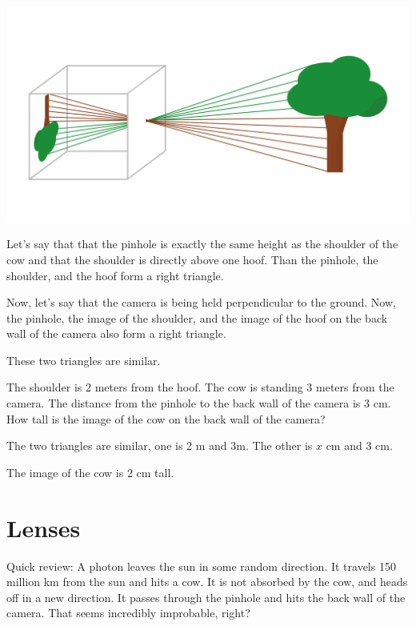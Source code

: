 \includegraphics[width=1\textwidth]{pinhole.png}

\begin{Exercise}[title={Height of the image}, label=image_height]

Let's say that that the pinhole is exactly the same height as the
shoulder of the cow and that the shoulder is directly above one hoof.
Than the pinhole, the shoulder, and the hoof form a right triangle.

Now, let's say that the camera is being held perpendicular to the
ground.  Now, the pinhole, the image of the shoulder, and the image of
the hoof on the back wall of the camera also form a right triangle.

These two triangles are similar.

The shoulder is 2 meters from the hoof.  The cow is standing 3 meters
from the camera.  The distance from the pinhole to the back wall of
the camera is 3 cm.  How tall is the image of the cow on the back wall
of the camera?

\end{Exercise}
\begin{Answer}[ref=image_height]

The two triangles are similar, one is 2 m and 3m.  The other is $x$ cm and 3 cm.

The image of the cow is 2 cm tall.

\end{Answer}

\section{Lenses}

Quick review: A photon leaves the sun in some random direction. It
travels 150 million km from the sun and hits a cow.  It is not
absorbed by the cow, and heads off in a new direction.  It passes
through the pinhole and hits the back wall of the camera.  That seems
incredibly improbable, right?

